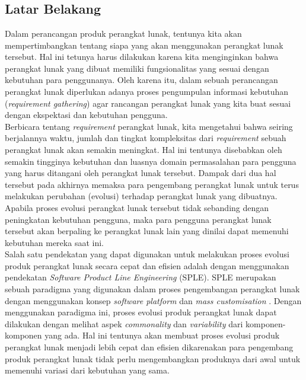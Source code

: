 \chapter{\babSatu}

\section{Latar Belakang}
Dalam perancangan produk perangkat lunak, tentunya kita akan mempertimbangkan tentang siapa yang akan menggunakan perangkat lunak tersebut. Hal ini tetunya harus dilakukan karena kita menginginkan bahwa perangkat lunak yang dibuat memiliki fungsionalitas yang sesuai dengan kebutuhan para penggunanya. Oleh karena itu, dalam sebuah perancangan perangkat lunak diperlukan adanya proses pengumpulan informasi kebutuhan (\textit{requirement gathering}) agar rancangan perangkat lunak yang kita buat sesuai dengan ekspektasi dan kebutuhan pengguna. \\

\noindent
Berbicara tentang \textit{requirement} perangkat lunak, kita mengetahui bahwa seiring berjalannya waktu, jumlah dan tingkat kompleksitas dari \textit{requirement} sebuah perangkat lunak akan semakin meningkat. Hal ini tentunya disebabkan oleh semakin tingginya kebutuhan dan luasnya domain permasalahan para pengguna yang harus ditangani oleh perangkat lunak tersebut. Dampak dari dua hal tersebut pada akhirnya memaksa para pengembang perangkat lunak untuk terus melakukan perubahan (evolusi) terhadap perangkat lunak yang dibuatnya. Apabila proses evolusi perangkat lunak tersebut tidak sebanding dengan peningkatan kebutuhan pengguna, maka para pengguna perangkat lunak tersebut akan berpaling ke perangkat lunak lain yang dinilai dapat memenuhi kebutuhan mereka saat ini. \\

\noindent
Salah satu pendekatan yang dapat digunakan untuk melakukan proses evolusi produk perangkat lunak secara cepat dan efisien adalah dengan menggunakan pendekatan \textit{Software Product Line Engineering} (SPLE). SPLE merupakan sebuah paradigma yang digunakan dalam proses pengembangan perangkat lunak dengan menggunakan konsep \textit{software platform} dan \textit{mass customisation} \citep[p.~14]{pohl2005software}. Dengan menggunakan paradigma ini, proses evolusi produk perangkat lunak dapat dilakukan dengan melihat aspek \textit{commonality} dan \textit{variability} dari komponen-komponen yang ada. Hal ini tentunya akan membuat proses evolusi produk perangkat lunak menjadi lebih cepat dan efisien dikarenakan para pengembang produk perangkat lunak tidak perlu mengembangkan produknya dari awal untuk memenuhi variasi dari kebutuhan yang sama. \\

